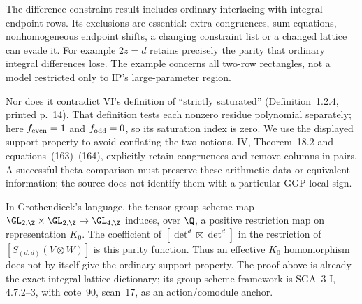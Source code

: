 The difference-constraint result includes ordinary interlacing with integral endpoint rows. Its exclusions are essential: extra congruences, sum equations, nonhomogeneous endpoint shifts, a changing constraint list or a changed lattice can evade it. For example $2z=d$ retains precisely the parity that ordinary integral differences lose. The example concerns all two-row rectangles, not a model restricted only to IP's large-parameter region.

Nor does it contradict VI's definition of ``strictly saturated'' (Definition~1.2.4, printed p.~14). That definition tests each nonzero residue polynomial separately; here $f_{\rm even}=1$ and $f_{\rm odd}=0$, so its saturation index is zero. We use the displayed support property to avoid conflating the two notions. IV, Theorem~18.2 and equations~(163)--(164), explicitly retain congruences and remove columns in pairs. A successful theta comparison must preserve these arithmetic data or equivalent information; the source does not identify them with a particular GGP local sign.

In Grothendieck's language, the tensor group-scheme map $\GL_{2,\Z}\times\GL_{2,\Z}\to\GL_{4,\Z}$ induces, over $\Q$, a positive restriction map on representation $K_0$. The coefficient of $[\det^d\boxtimes\det^d]$ in the restriction of $[S_{(d,d)}(V\otimes W)]$ is this parity function. Thus an effective $K_0$ homomorphism does not by itself give the ordinary support property. The proof above is already the exact integral-lattice dictionary; its group-scheme framework is SGA~3 I, 4.7.2--3, with cote~90, scan~17, as an action/comodule anchor.
